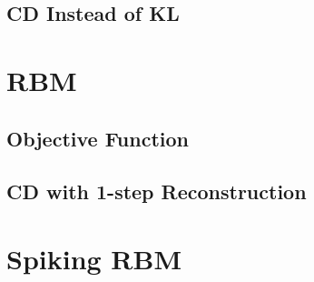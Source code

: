 \documentclass[11pt,twoside,a4paper]{article}
\begin{document}
\subsection{CD Instead of KL}
\section{RBM\cite{zhang2013rbm}}
\subsection{Objective Function}
\subsection{CD with 1-step Reconstruction}
\section{Spiking RBM\cite{neftci2013event}}

 

\end{document}
